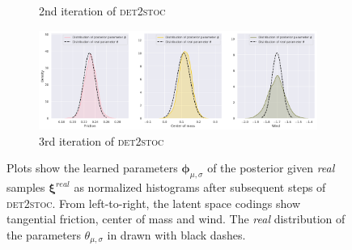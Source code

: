 \documentclass{kththesis}
\newcommand{\vph}{\boldsymbol{\phi}}
\newcommand{\vpsi}{\vec{\psi}}
\renewcommand{\vec}[1]{\boldsymbol{#1}}
\newcommand{\dettostoc}{\textsc{det2stoc}}
\begin{document}
\begin{figure}
\begin{subfigure}{\textwidth}
  \caption{2nd iteration of \dettostoc{}}
\end{subfigure}
\begin{subfigure}{\textwidth}
  \includegraphics[width=1.0\linewidth]{img/windyslope/latent-representation/new/latent_encoding_iter3}
  \caption{3rd iteration of \dettostoc{}}
\end{subfigure}
\caption{Plots show the learned parameters $\vph_{\mu, \sigma}$ of the posterior given \emph{real} samples $\vec{\xi}^{real}$ as normalized histograms after subsequent steps of \dettostoc{}.
From left-to-right, the latent space codings show tangential friction, center of mass and wind. %
The \emph{real} distribution of the parameters $\theta_{\mu, \sigma}$ in drawn with black dashes.}
\label{fig:windyslope_latent_space_full}
\end{figure}
\end{document}
